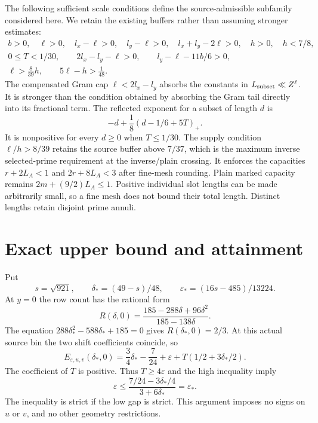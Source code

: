 \documentclass[11pt]{article}
\newcommand{\eps}{\varepsilon}
\begin{document}
The following sufficient scale conditions define the source-admissible
subfamily considered here. We retain the existing buffers rather than
assuming stronger estimates:
\begin{gather*}
 b>0,\quad \ell>0,\quad l_x-\ell>0,\quad l_y-\ell>0,\quad
 l_x+l_y-2\ell>0,\quad h>0,\quad h<7/8,\\
 0\le T<1/30,\qquad 2l_x-l_y-\ell>0,\qquad
 l_y-\ell-11b/6>0,\\
 \ell>\frac8{39}h,\qquad 5\ell-h>\frac1{48}.
\end{gather*}
The compensated Gram cap $\ell<2l_x-l_y$ absorbs the constants
in $L_{\rm subset}\ll Z^\ell$. It is stronger than the condition
obtained by absorbing the Gram tail directly into its fractional term.
The reflected exponent for a subset of length $d$ is
\[
 -d+\frac18(d-1/6+5T)_+.
\]
It is nonpositive for every $d\ge0$ when $T\le1/30$.
The supply condition $\ell/h>8/39$ retains the source buffer above
$7/37$, which is the maximum inverse selected-prime requirement at
the inverse/plain crossing. It enforces the capacities
$r+2L_A<1$ and $2r+8L_A<3$ after fine-mesh rounding. Plain marked
capacity remains $2m+(9/2)L_A\le1$. Positive individual slot lengths
can be made arbitrarily small, so a fine mesh does not bound their
total length. Distinct lengths retain disjoint prime annuli.

\section{Exact upper bound and attainment}

Put
\[
 s=\sqrt{921},\qquad \delta_*=(49-s)/48,
 \qquad \eps_*=(16s-485)/13224.
\]
At $y=0$ the row count has the rational form
\[
 R(\delta,0)=\frac{185-288\delta+96\delta^2}{185-138\delta}.
\]
The equation $288\delta_*^2-588\delta_*+185=0$ gives
$R(\delta_*,0)=2/3$. At this actual source bin the two shift
coefficients coincide, so
\[
 E_{\eps,u,v}(\delta_*,0)=\frac34\delta_*-\frac7{24}
      +\eps+T(1/2+3\delta_*/2).
\]
The coefficient of $T$ is positive. Thus $T\ge4\eps$ and the high
inequality imply
\[
 \eps\le\frac{7/24-3\delta_*/4}{3+6\delta_*}=\eps_*.
\]
The inequality is strict if the low gap is strict. This argument imposes
no signs on $u$ or $v$, and no other geometry restrictions.
\end{document}
